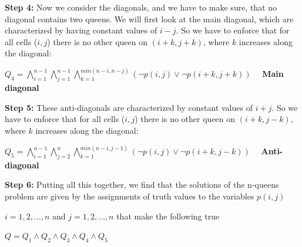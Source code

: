 \newpage
\begin{tcolorbox}[title=Example 1: The n-Queens Problem (2/2)]
\textbf{Step 4:} Now we consider the diagonals, and we have to make sure, that no diagonal contains two queens. We will first look at the main diagonal, which are characterized by having constant values of $i-j$. So we have to enforce that for all cells ($i,j$) there is no other queen on $(i+k, j+k)$, where $k$ increases along the diagonal:
\begin{center}
$Q_4 = \bigwedge_{i=1}^{n-1} \bigwedge_{j=1}^{n-1} \bigwedge_{k=1}^{min(n-i,n-j)} (\neg p(i,j) \lor \neg p(i+k,j+k)) $   \ \  \textbf{Main diagonal}
\end{center} 
\textbf{Step 5:} These anti-diagonals are characterized by constant values of $i+j$. So we have to enforce that for all cells ($i,j$) there is no other queen on $(i+k, j-k)$, where $k$ increases along the diagonal: 
\begin{center}
$Q_5 = \bigwedge_{i=1}^{n-1} \bigwedge_{j=2}^{n} \bigwedge_{k=1}^{min(n-i,j-1)} (\neg p(i,j) \lor \neg p(i+k,j-k)) $  \ \  \textbf{Anti-diagonal} 
\end{center} 
\textbf{Step 6:} Putting all this together, we find that the solutions of the n-queens problem are given
by the assignments of truth values to the variables $p(i,j) $ 
\begin{center}
$i=1,2,\ldots,n$  and $j=1,2,\ldots,n$ that make the following true
\end{center}
\begin{center}
$Q=Q_1 \land Q_2 \land Q_3 \land Q_4 \land Q_5$    
\end{center}{}
\end{tcolorbox}


